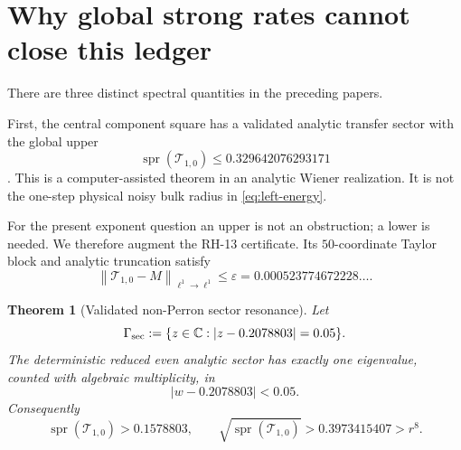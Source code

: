 \documentclass[11pt]{article}
\newtheorem{theorem}{Theorem}[section]
\theoremstyle{remark}
\newcommand{\norm}[1]{\left\lVert#1\right\rVert}
\newcommand{\spr}{\operatorname{spr}}
\begin{document}
\section{Why global strong rates cannot close this ledger}

There are three distinct spectral quantities in the preceding papers.

First, the central component square has a validated analytic transfer sector
with the global upper
\begin{equation}
 \spr(\mathcal T_{1,0})
\le0.329642076293171
 \label{eq:central-radius}
\end{equation}
\citep{WangValidatedGap2026}.  This is a computer-assisted theorem in an
analytic Wiener realization.  It is not the one-step physical noisy bulk
radius in \eqref{eq:left-energy}.

For the present exponent question an upper is not an obstruction; a lower is
needed.  We therefore augment the RH-13 certificate.  Its $50$-coordinate
Taylor block and analytic truncation satisfy
\begin{equation}
 \norm{\mathcal T_{1,0}-M}_{\ell^1\to\ell^1}
 \le\varepsilon
 =0.000523774672228\ldots.
 \label{eq:sector-tail}
\end{equation}

\begin{theorem}[Validated non-Perron sector resonance]
\label{thm:sector-resonance}
Let
\[
 \Gamma_{\rm sec}:=\{z\in\mathbb C:|z-0.2078803|=0.05\}.
\]
The deterministic reduced even analytic sector has exactly one eigenvalue,
counted with algebraic multiplicity, in
\begin{equation}
 |w-0.2078803|<0.05.
 \label{eq:sector-circle}
\end{equation}
Consequently
\begin{equation}
 \spr(\mathcal T_{1,0})>0.1578803,
 \qquad
 \sqrt{\spr(\mathcal T_{1,0})}>0.3973415407>r^8.
 \label{eq:sector-lower}
\end{equation}
\end{theorem}
\end{document}
